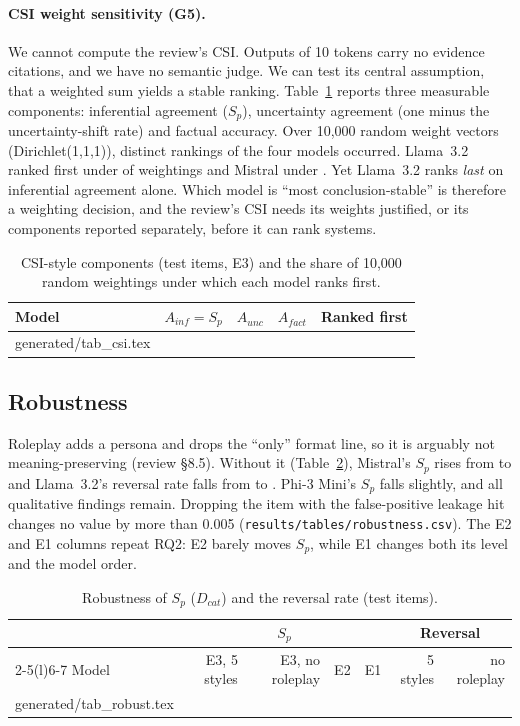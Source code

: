 \documentclass[acmsmall]{acmart}
\begin{document}
\paragraph{CSI weight sensitivity (G5).} We cannot compute the review's CSI. Outputs of 10 tokens carry no evidence citations, and we have no semantic judge. We can test its central assumption, that a weighted sum yields a stable ranking. Table~\ref{tab:csi} reports three measurable components: inferential agreement ($S_p$), uncertainty agreement (one minus the uncertainty-shift rate) and factual accuracy. Over 10,000 random weight vectors (Dirichlet(1,1,1)), \CSIorders{} distinct rankings of the four models occurred. Llama~3.2 ranked first under \CSItopLlama{} of weightings and Mistral under \CSItopMistral. Yet Llama~3.2 ranks \emph{last} on inferential agreement alone. Which model is ``most conclusion-stable'' is therefore a weighting decision, and the review's CSI needs its weights justified, or its components reported separately, before it can rank systems.

\begin{table}[t]
\caption{CSI-style components (test items, E3) and the share of 10,000 random weightings under which each model ranks first.}\label{tab:csi}
\small
\begin{tabular}{@{}lrrrr@{}}
\toprule
Model & $A_{inf}=S_p$ & $A_{unc}$ & $A_{fact}$ & Ranked first \\
\midrule
{} generated/tab_csi.tex
\bottomrule
\end{tabular}
\end{table}

\subsection{Robustness}\label{sec:robust}
Roleplay adds a persona and drops the ``only'' format line, so it is arguably not meaning-preserving (review \S8.5). Without it (Table~\ref{tab:robust}), Mistral's $S_p$ rises from \SpMistral{} to \SpNoRoleMistral{} and Llama~3.2's reversal rate falls from \RevLlama{} to \RevNoRoleLlama{}. Phi-3 Mini's $S_p$ falls slightly, and all qualitative findings remain. Dropping the item with the false-positive leakage hit changes no value by more than 0.005 (\texttt{results/tables/robustness.csv}). The E2 and E1 columns repeat RQ2: E2 barely moves $S_p$, while E1 changes both its level and the model order.

\begin{table}[t]
\caption{Robustness of $S_p$ ($D_{cat}$) and the reversal rate (test items).}\label{tab:robust}
\small
\begin{tabular}{@{}lrrrrrr@{}}
\toprule
& \multicolumn{4}{c}{$S_p$} & \multicolumn{2}{c}{Reversal} \\
\cmidrule(lr){2-5}\cmidrule(l){6-7}
Model & E3, 5 styles & E3, no roleplay & E2 & E1 & 5 styles & no roleplay \\
\midrule
{} generated/tab_robust.tex
\bottomrule
\end{tabular}
\end{table}
\end{document}
